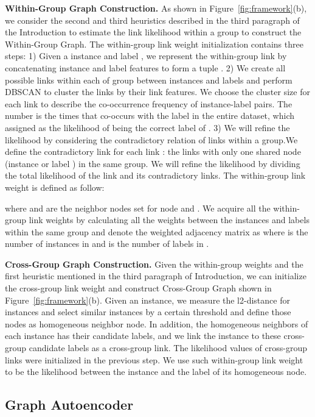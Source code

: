 \documentclass[letterpaper]{article} \usepackage{aaai20}  \usepackage{times}  \usepackage{helvet} \usepackage{courier}  \usepackage[hyphens]{url}  \usepackage{graphicx} \urlstyle{rm} \def\UrlFont{\rm}  \frenchspacing  \setlength{\pdfpagewidth}{8.5in}  \setlength{\pdfpageheight}{11in}  \frenchspacing
\begin{document}
  
\noindent\textbf{Within-Group Graph Construction.} 
As shown in Figure~\ref{fig:framework}(b), we consider the second and third heuristics described in the third paragraph of the Introduction to estimate the link likelihood within a group to construct the Within-Group Graph. 
The within-group link weight initialization contains three steps:
1) Given a instance  and label , we represent the within-group link  by concatenating instance and label features to form a tuple . 2) We create all possible links within each of group between instances and labels and perform DBSCAN \cite{sander1998density} to 
cluster the links by their link features. We choose the cluster size  for each link to describe the co-occurrence frequency of instance-label pairs. 
The number is the times that  co-occurs with the label  in the entire dataset, which assigned as the likelihood of  being the correct label of .  3) We will refine the likelihood by considering the contradictory relation of links within a group.We define the contradictory link for each link : the links with only one shared node (instance  or label ) in the same group. We will refine the likelihood by dividing the total likelihood of the link  and its contradictory links. The within-group link weight is defined as follow: 

where  and  are the neighbor nodes set for node  and . 
We acquire all the within-group link weights by calculating all the weights between the instances and labels within the same group and denote the weighted adjacency matrix as  where  is the number of instances in  and  is the number of labels in . 


\noindent\textbf{Cross-Group Graph Construction.}
Given the within-group weights  and the first heuristic mentioned in the third paragraph of Introduction, we can initialize the cross-group link weight and construct Cross-Group Graph shown in Figure~\ref{fig:framework}(b).
Given an instance, 
we measure the l2-distance for instances
and select similar instances by a certain threshold  and define those nodes as homogeneous neighbor node. In addition, the homogeneous neighbors of each instance has their candidate labels, and we link the instance to these cross-group candidate labels as a cross-group link. The likelihood values of cross-group links were initialized in the previous step. 
We use such within-group link weight to be the likelihood between the instance and the label of its homogeneous node.

\subsection{Graph Autoencoder}  
\end{document}
